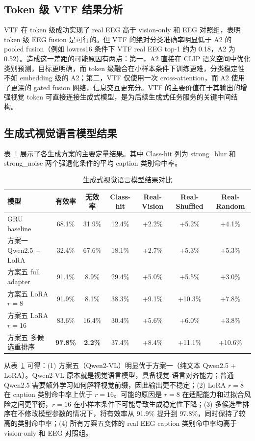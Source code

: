\subsection{Token 级 VTF 结果分析}

VTF 在 token 级成功实现了 real EEG 高于 vision-only 和 EEG 对照组，表明 token 级 EEG fusion 是可行的。但 VTF 的绝对分类准确率明显低于 A2 的 pooled fusion（例如 lowres16 条件下 VTF real EEG top-1 约为 0.18，A2 为 0.52）。造成这一差距的可能原因有两点：第一，A2 直接在 CLIP 语义空间中优化类别预测，目标更明确，而 token 级融合在小样本条件下训练更难，分类稳定性不如 embedding 级的 A2；第二，VTF 仅使用一次 cross-attention，而 A2 使用了更深的 gated fusion 网络，信息交互更充分。VTF 的主要价值在于其输出的增强视觉 token 可直接连接生成式模型，是为后续生成式任务服务的关键中间结构。

\subsection{生成式视觉语言模型结果}

表~\ref{tab:evlm-results} 展示了各生成方案的主要定量结果。其中 Class-hit 列为 strong\_blur 和 strong\_noise 两个强退化条件的平均 caption 类别命中率。

\begin{table}[htbp]
  \centering
  \caption{生成式视觉语言模型结果对比}
  \label{tab:evlm-results}
  \begin{tabular}{l c c c c c c}
    \toprule
    模型 & 有效率 & 无效率 & Class-hit & Real-Vision & Real-Shuffled & Real-Random \\
    \midrule
    GRU baseline & 68.1\% & 31.9\% & 12.4\% & +2.2\% & +5.2\% & +4.1\% \\
    方案一 Qwen2.5 + LoRA & 32.4\% & 67.6\% & 18.1\% & +2.7\% & +5.3\% & +5.3\% \\
    方案五 full adapter & 91.1\% & 8.9\% & 29.4\% & +5.0\% & +5.5\% & +3.0\% \\
    方案五 LoRA $r=8$ & 91.9\% & 8.1\% & 38.3\% & +9.1\% & +10.3\% & +7.8\% \\
    方案五 LoRA $r=16$ & 83.6\% & 16.4\% & 30.4\% & +5.6\% & +6.0\% & +3.8\% \\
    方案五 多候选重排序 & \textbf{97.8\%} & \textbf{2.2\%} & 37.4\% & +8.4\% & +11.1\% & +10.6\% \\
    \bottomrule
  \end{tabular}
\end{table}

从表~\ref{tab:evlm-results} 可得：(1) 方案五（Qwen2-VL）明显优于方案一（纯文本 Qwen2.5 + LoRA）。Qwen2-VL 原本就是视觉语言模型，具备视觉-语言对齐能力；普通 Qwen2.5 需要额外学习如何解释视觉前缀，因此输出更不稳定；(2) LoRA $r=8$ 在 caption 类别命中率上优于 $r=16$。可能的原因是 $r=8$ 在适配能力和过拟合风险之间更平衡，$r=16$ 在小样本条件下可能导致生成稳定性下降；(3) 多候选重排序在不修改模型参数的情况下，将有效率从 91.9\% 提升到 97.8\%，同时保持了较高的类别命中率；(4) 所有方案五变体的 real EEG caption 类别命中率均高于 vision-only 和 EEG 对照组。

